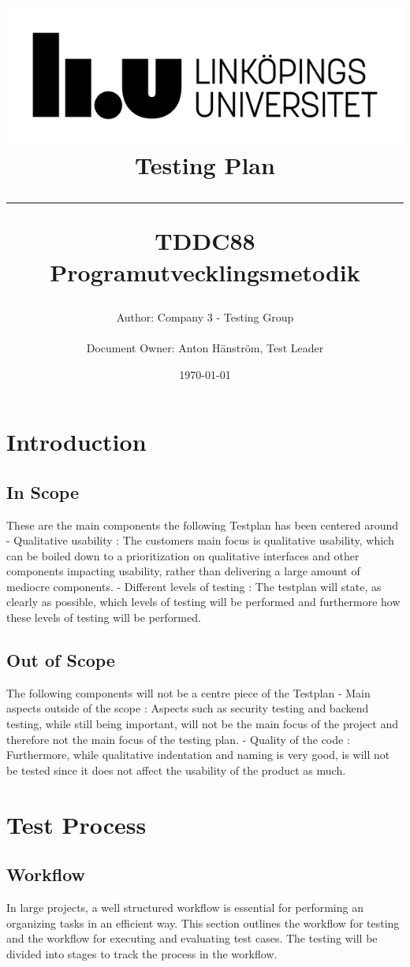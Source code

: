 \documentclass{article}
\title{
\includegraphics[scale=1.5]{liu_logga.png} \\
\vspace{2.0cm} \textbf{Testing Plan} \\
 \endgraf\rule{\textwidth}{.4pt}
  \large \textbf{TDDC88 Programutvecklingsmetodik}\\
   }
\author{Author: Company 3 - Testing Group \\ \\
    Document Owner: Anton Hänström, Test Leader}
\date{\today}
\begin{document}
\maketitle
\newpage
 

\newpage
\tableofcontents
\newpage




\section{Introduction}

\subsection{In Scope}

These are the main components the following Testplan has been centered around
\newline
\newline - Qualitative usability : The customers main focus is qualitative usability, which can be boiled down to a prioritization on qualitative interfaces and other components impacting usability, rather than delivering a large amount of mediocre components. 
\newline- Different levels of testing : The testplan will state, as clearly as possible, which levels of testing will be performed and furthermore how these levels of testing will be performed. 
\subsection{Out of Scope}
The following components will not be a centre piece of the Testplan
\newline
\newline- Main aspects outside of the scope : Aspects such as security testing and backend testing, while still being important, will not be the main focus of the project and therefore not the main focus of the testing plan. 
\newline - Quality of the code : Furthermore, while qualitative indentation and naming is very good, is will not be tested since it does not affect the usability of the product as much.

\section{Test Process}
\subsection{Workflow}
In large projects, a well structured workflow is essential for performing an organizing tasks in an efficient way. This section outlines the workflow for testing and the workflow for executing and evaluating test cases. The testing will be divided into stages to track the process in the workflow. \newline
\end{document}
